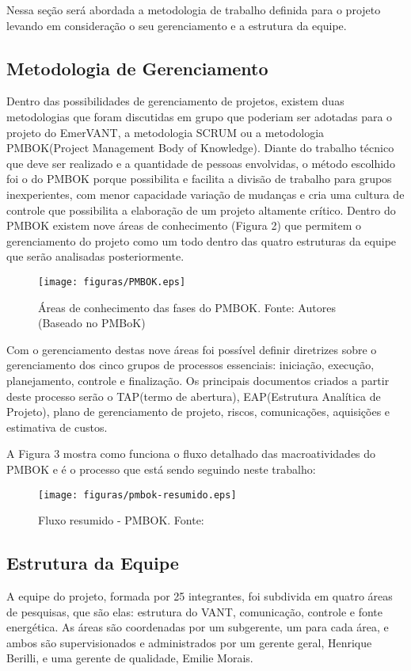 Nessa seção será abordada a metodologia de trabalho definida para o projeto levando em consideração o seu gerenciamento e a estrutura da equipe.
\subsection{Metodologia de Gerenciamento}

Dentro das possibilidades de gerenciamento de projetos, existem duas metodologias que foram discutidas em grupo que poderiam ser adotadas para o projeto do EmerVANT, a metodologia SCRUM ou a metodologia PMBOK(Project Management Body of Knowledge). Diante do trabalho técnico que deve ser realizado e a quantidade de pessoas envolvidas, o método escolhido foi o do PMBOK porque possibilita e facilita a divisão de trabalho para grupos inexperientes, com menor capacidade variação de mudanças e cria uma cultura de controle que possibilita a elaboração de um projeto altamente crítico. Dentro do PMBOK existem nove áreas de conhecimento (Figura 2) que permitem o gerenciamento do projeto como um todo dentro das quatro estruturas da equipe que serão analisadas posteriormente.

 \begin{figure}[H]
	\centering
		\texttt{[image: figuras/PMBOK.eps]}
	\caption[Áreas de conhecimento das fases do PMBOK]{Áreas de conhecimento das fases do PMBOK. Fonte: Autores (Baseado no PMBoK)}
\end{figure}

Com o gerenciamento destas nove áreas foi possível definir diretrizes sobre o gerenciamento dos cinco grupos de processos essenciais: iniciação, execução, planejamento, controle e finalização. Os principais documentos criados a partir deste processo serão o TAP(termo de abertura), EAP(Estrutura Analítica de Projeto), plano de gerenciamento de projeto, riscos, comunicações, aquisições e estimativa de custos.

A Figura 3 mostra como funciona o fluxo detalhado das macroatividades do PMBOK e é o processo que está sendo seguindo neste trabalho:

\begin{figure}[H]
	\centering
		\texttt{[image: figuras/pmbok-resumido.eps]}
	\caption[Fluxo resumido - PMBOK]{Fluxo resumido - PMBOK. Fonte: \cite{pmbok}}
\end{figure}

\subsection{Estrutura da Equipe}
A equipe do projeto, formada por 25 integrantes, foi subdivida em quatro áreas de pesquisas, que são elas: estrutura do VANT, comunicação, controle e fonte energética. As áreas são coordenadas por um subgerente, um para cada área, e ambos são supervisionados e administrados por um gerente geral, Henrique Berilli, e uma gerente de qualidade, Emilie Morais.

